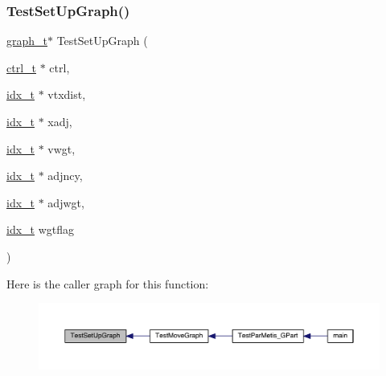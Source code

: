 \subsubsection{\texorpdfstring{Test\+Set\+Up\+Graph()}{TestSetUpGraph()}}
{\footnotesize\ttfamily \hyperlink{a00734}{graph\+\_\+t}$\ast$ Test\+Set\+Up\+Graph (\begin{DoxyParamCaption}\item[{\hyperlink{a00742}{ctrl\+\_\+t} $\ast$}]{ctrl,  }\item[{\hyperlink{a00876_aaa5262be3e700770163401acb0150f52}{idx\+\_\+t} $\ast$}]{vtxdist,  }\item[{\hyperlink{a00876_aaa5262be3e700770163401acb0150f52}{idx\+\_\+t} $\ast$}]{xadj,  }\item[{\hyperlink{a00876_aaa5262be3e700770163401acb0150f52}{idx\+\_\+t} $\ast$}]{vwgt,  }\item[{\hyperlink{a00876_aaa5262be3e700770163401acb0150f52}{idx\+\_\+t} $\ast$}]{adjncy,  }\item[{\hyperlink{a00876_aaa5262be3e700770163401acb0150f52}{idx\+\_\+t} $\ast$}]{adjwgt,  }\item[{\hyperlink{a00876_aaa5262be3e700770163401acb0150f52}{idx\+\_\+t}}]{wgtflag }\end{DoxyParamCaption})}

Here is the caller graph for this function\+:\nopagebreak
\begin{figure}[H]
\begin{center}
\leavevmode
\includegraphics[width=350pt]{a00437_aff9e935a0b03f0424e9c241573bb437b_icgraph}
\end{center}
\end{figure}
